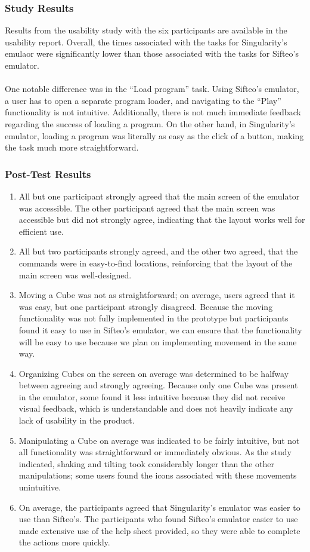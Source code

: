 \documentclass[12pt]{article}
\begin{document}
\subsubsection{Study Results}
Results from the usability study with the six participants are available in the usability report. Overall, the times associated with the tasks for Singularity's emulaor were significantly lower than those associated with the tasks for Sifteo's emulator.  \\\\
One notable difference was in the ``Load program'' task.  Using Sifteo's emulator, a user has to open a separate program loader, and navigating to the ``Play'' functionality is not intuitive.  Additionally, there is not much immediate feedback regarding the success of loading a program.  On the other hand, in Singularity's emulator, loading a program was literally as easy as the click of a button, making the task much more straightforward.

\subsubsection{Post-Test Results}
\begin{enumerate}
        \item{All but one participant strongly agreed that the main screen of the emulator was accessible. The other participant agreed that the main screen was accessible but did not strongly agree, indicating that the layout works well for efficient use.}
        \item{All but two participants strongly agreed, and the other two agreed, that the commands were in easy-to-find locations, reinforcing that the layout of the main screen was well-designed.}
        \item{Moving a Cube was not as straightforward; on average, users agreed that it was easy, but one participant strongly disagreed.  Because the moving functionality was not fully implemented in the prototype but participants found it easy to use in Sifteo's emulator, we can ensure that the functionality will be easy to use because we plan on implementing movement in the same way.}
        \item{Organizing Cubes on the screen on average was determined to be halfway between agreeing and strongly agreeing. Because only one Cube was present in the emulator, some found it less intuitive because they did not receive visual feedback, which is understandable and does not heavily indicate any lack of usability in the product.}
        \item{Manipulating a Cube on average was indicated to be fairly intuitive, but not all functionality was straightforward or immediately obvious.  As the study indicated, shaking and tilting took considerably longer than the other manipulations; some users found the icons associated with these movements unintuitive.}
        \item{On average, the participants agreed that Singularity's emulator was easier to use than Sifteo's.  The participants who found Sifteo's emulator easier to use made extensive use of the help sheet provided, so they were able to complete the actions more quickly.}
\end{enumerate}
\end{document}
